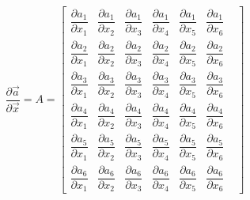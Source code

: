 \begin{equation}
	\dfrac{\partial \vec a}{\partial \vec x} = A = 
	\begin{bmatrix}
\dfrac{\partial  a_1}{\partial  x_1}&
\dfrac{\partial  a_1}{\partial  x_2}&
\dfrac{\partial  a_1}{\partial  x_3}&
\dfrac{\partial  a_1}{\partial  x_4}&
\dfrac{\partial  a_1}{\partial  x_5}&
\dfrac{\partial  a_1}{\partial  x_6}&
\\[1em]
\dfrac{\partial  a_2}{\partial  x_1}&
\dfrac{\partial  a_2}{\partial  x_2}&
\dfrac{\partial  a_2}{\partial  x_3}&
\dfrac{\partial  a_2}{\partial  x_4}&
\dfrac{\partial  a_2}{\partial  x_5}&
\dfrac{\partial  a_2}{\partial  x_6}&
\\[1em]
\dfrac{\partial  a_3}{\partial  x_1}&
\dfrac{\partial  a_3}{\partial  x_2}&
\dfrac{\partial  a_3}{\partial  x_3}&
\dfrac{\partial  a_3}{\partial  x_4}&
\dfrac{\partial  a_3}{\partial  x_5}&
\dfrac{\partial  a_3}{\partial  x_6}&
\\[1em]
\dfrac{\partial  a_4}{\partial  x_1}&
\dfrac{\partial  a_4}{\partial  x_2}&
\dfrac{\partial  a_4}{\partial  x_3}&
\dfrac{\partial  a_4}{\partial  x_4}&
\dfrac{\partial  a_4}{\partial  x_5}&
\dfrac{\partial  a_4}{\partial  x_6}&
\\[1em]
\dfrac{\partial  a_5}{\partial  x_1}&
\dfrac{\partial  a_5}{\partial  x_2}&
\dfrac{\partial  a_5}{\partial  x_3}&
\dfrac{\partial  a_5}{\partial  x_4}&
\dfrac{\partial  a_5}{\partial  x_5}&
\dfrac{\partial  a_5}{\partial  x_6}&
\\[1em]
\dfrac{\partial  a_6}{\partial  x_1}&
\dfrac{\partial  a_6}{\partial  x_2}&
\dfrac{\partial  a_6}{\partial  x_3}&
\dfrac{\partial  a_6}{\partial  x_4}&
\dfrac{\partial  a_6}{\partial  x_5}&
\dfrac{\partial  a_6}{\partial  x_6}&
	\end{bmatrix}
\end{equation}
